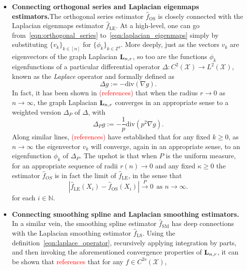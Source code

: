 \documentclass{article}
\newcommand{\abs}[1]{\left \lvert #1 \right \rvert}
\newcommand{\1}{\mathbf{1}}
\newcommand{\Lap}{{\bf L}}
\newcommand{\Xset}{\mathcal{X}}
\newcommand{\Leb}{L}
\newcommand{\wh}[1]{\widehat{#1}}
\newcommand{\LE}{\mathrm{LE}}
\newcommand{\LS}{\mathrm{LS}}
\newcommand{\SM}{\mathrm{SM}}
\newcommand{\OS}{\mathrm{OS}}
\theoremstyle{alden}
\theoremstyle{aldenthm}
\theoremstyle{definition}
\theoremstyle{remark}
\begin{document}
\begin{itemize}
	\item \textbf{Connecting orthogonal series and Laplacian eigenmaps estimators.}The orthogonal series estimator $\wh{f}_{\OS}$ is closely connected with the Laplacian eigenmaps estimator $\wh{f}_{\LE}$. At a high-level, one can go from~\eqref{eqn:orthogonal_series} to~\eqref{eqn:laplacian_eigenmaps} simply by substituting $\{v_k\}_{k \in [n]}$ for $\{\phi_k\}_{k \in \mathbb{Z}^d}$. More deeply, just as the vectors $v_k$ are eigenvectors of the graph Laplacian $\Lap_{n,r}$, so too are the functions $\phi_k$ eigenfunctions of a particular differential operator $\Delta: C^2(\Xset) \to \Leb^2(\Xset)$, known as the \emph{Laplace} operator and formally defined as
	\begin{equation}
	\label{eqn:laplace_operator}
	\Delta g := -\mathrm{div}(\nabla g).
	\end{equation}
	In fact, it has been shown in \textcolor{red}{(references)} that when the radius $r \to 0$ as $n \to \infty$, the graph Laplacian $\Lap_{n,r}$ converges in an appropriate sense to a weighted version $\Delta_{P}$ of $\Delta$, with
	\begin{equation}
	\Delta_{P} g := -\frac{1}{p}\mathrm{div}(p^2 \nabla g).
	\end{equation}
	Along similar lines, \textcolor{red}{(references)} have established that for any fixed $k \geq 0$, as $n \to \infty$ the eigenvector $v_k$ will converge, again in an appropriate sense, to an eigenfunction $\phi_k$ of $\Delta_{P}$. The upshot is that when $P$ is the uniform measure, for an appropriate sequence of radii $r(n) \to 0$ and any fixed $\kappa \geq 0$ the estimator $\wh{f}_{OS}$ is in fact the limit of $\wh{f}_{\LE}$, in the sense that
	\begin{equation}
	\label{eqn:laplacian_eigenmaps_consistency}
	\abs{\wh{f}_{\LE}(X_i) - \wh{f}_{\OS}(X_i)} \overset{P}{\to} 0~~\textrm{as $n \to \infty$.}
	\end{equation} 
	for each $i \in \mathbb{N}$.
	\item 
	\textbf{Connecting smoothing spline and Laplacian smoothing estimators.} In a similar vein, the smoothing spline estimator $\wh{f}_{\SM}$ has deep connections with the Laplacian smoothing estimator $\wh{f}_{\LS}$. Using the definition~\eqref{eqn:laplace_operator}, recursively applying integration by parts, and then invoking the aforementioned convergence properties of $\Lap_{n,r}$, it can be shown that \textcolor{red}{references} that for any $f \in C^{2s}(\Xset)$,
	\begin{equation}

\end{equation}
\end{itemize}
\end{document}
